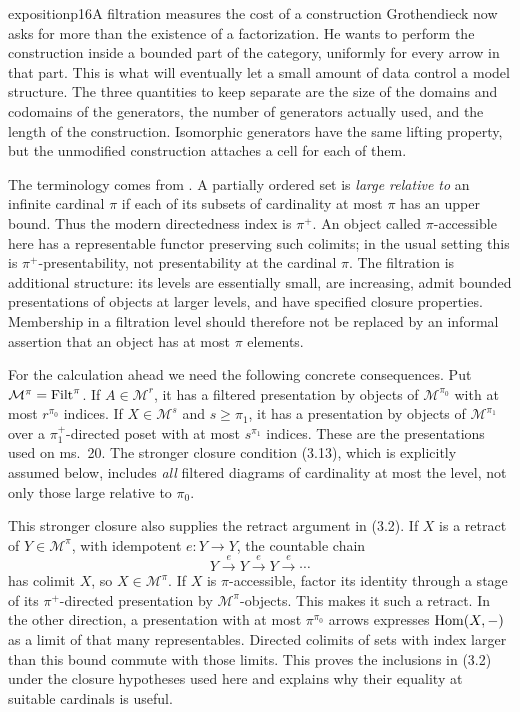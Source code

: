 \begin{dcomment}{exposition}{p16}{A filtration measures the cost of a construction}
Grothendieck now asks for more than the existence of a factorization. He wants to perform the construction inside a bounded part of the category, uniformly for every arrow in that part. This is what will eventually let a small amount of data control a model structure. The three quantities to keep separate are the size of the domains and codomains of the generators, the number of generators actually used, and the length of the construction. Isomorphic generators have the same lifting property, but the unmodified construction attaches a cell for each of them.

The terminology comes from \citet[Expos\'e I, Definitions 9.1--9.3 and 9.12]{SGA4I1972}. A partially ordered set is \emph{large relative to} an infinite cardinal $\pi$ if each of its subsets of cardinality at most $\pi$ has an upper bound. Thus the modern directedness index is $\pi^+$. An object called $\pi$-accessible here has a representable functor preserving such colimits; in the usual setting this is $\pi^+$-presentability, not presentability at the cardinal $\pi$. The filtration is additional structure: its levels are essentially small, are increasing, admit bounded presentations of objects at larger levels, and have specified closure properties. Membership in a filtration level should therefore not be replaced by an informal assertion that an object has at most $\pi$ elements.

For the calculation ahead we need the following concrete consequences. Put $\mathcal M^\pi=\mathrm{Filt}^\pi$. If $A\in\mathcal M^r$, it has a filtered presentation by objects of $\mathcal M^{\pi_0}$ with at most $r^{\pi_0}$ indices. If $X\in\mathcal M^s$ and $s\geq\pi_1$, it has a presentation by objects of $\mathcal M^{\pi_1}$ over a $\pi_1^+$-directed poset with at most $s^{\pi_1}$ indices. These are the presentations used on ms.~20. The stronger closure condition (3.13), which is explicitly assumed below, includes \emph{all} filtered diagrams of cardinality at most the level, not only those large relative to $\pi_0$.

This stronger closure also supplies the retract argument in (3.2). If $X$ is a retract of $Y\in\mathcal M^\pi$, with idempotent $e:Y\to Y$, the countable chain
\[
Y\xrightarrow{e}Y\xrightarrow{e}Y\xrightarrow{e}\cdots
\]
has colimit $X$, so $X\in\mathcal M^\pi$. If $X$ is $\pi$-accessible, factor its identity through a stage of its $\pi^+$-directed presentation by $\mathcal M^\pi$-objects. This makes it such a retract. In the other direction, a presentation with at most $\pi^{\pi_0}$ arrows expresses $\operatorname{Hom}(X,-)$ as a limit of that many representables. Directed colimits of sets with index larger than this bound commute with those limits. This proves the inclusions in (3.2) under the closure hypotheses used here and explains why their equality at suitable cardinals is useful.
\end{dcomment}


